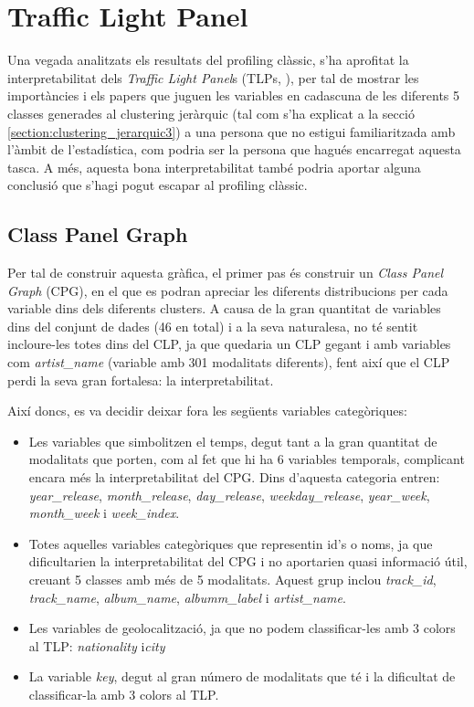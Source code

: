 \section{Traffic Light Panel }

Una vegada analitzats els resultats del profiling clàssic, s'ha aprofitat la interpretabilitat dels \textit{Traffic Light Panel}s (TLPs, \cite{gibert_2014_on} \cite{gibert_2015_atlp}), per tal de mostrar les importàncies i els papers que juguen les variables en cadascuna de les diferents 5 classes generades al clustering jeràrquic (tal com s'ha explicat a la secció \ref{section:clustering_jerarquic3}) a una persona que no estigui familiaritzada amb l'àmbit de l'estadística, com podria ser la persona que hagués encarregat aquesta tasca. A més, aquesta bona interpretabilitat també podria aportar alguna conclusió que s'hagi pogut escapar al profiling clàssic.

\subsection{Class Panel Graph}

Per tal de construir aquesta gràfica, el primer pas és construir un \textit{Class Panel Graph} (CPG), en el que es podran apreciar les diferents distribucions per cada variable dins dels diferents clusters. A causa de la gran quantitat de variables dins del conjunt de dades (46 en total) i a la seva naturalesa, no té sentit incloure-les totes dins del CLP, ja que quedaria un CLP gegant i amb variables com \textit{artist\_name} (variable amb 301 modalitats diferents), fent així que el CLP perdi la seva gran fortalesa: la interpretabilitat.

Així doncs, es va decidir deixar fora les següents variables categòriques:

\begin{itemize}
\item Les variables que simbolitzen el temps, degut tant a la gran quantitat de modalitats que porten, com al fet que hi ha 6 variables temporals, complicant encara més la interpretabilitat del CPG. Dins d'aquesta categoria entren: \textit{year\_release}, \textit{month\_release}, \textit{day\_release}, \textit{weekday\_release}, \textit{year\_week}, \textit{month\_week} i \textit{week\_index}.

\item Totes aquelles variables categòriques que representin id's o noms, ja que dificultarien la interpretabilitat del CPG i no aportarien quasi informació útil, creuant 5 classes amb més de 5 modalitats. Aquest grup inclou \textit{track\_id}, \textit{track\_name},\textit{ album\_name}, \textit{albumm\_label} i \textit{artist\_name}.

\item Les variables de geolocalització, ja que no podem classificar-les amb 3 colors al TLP: \textit{nationality} i\textit{city}

\item La variable \textit{key}, degut al gran número de modalitats que té i la dificultat de classificar-la amb 3 colors al TLP.
\end{itemize}

